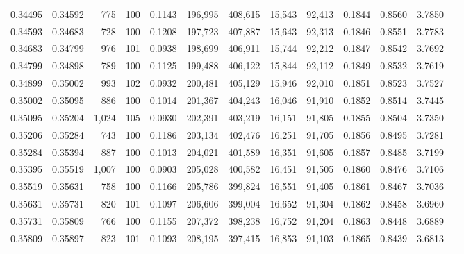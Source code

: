 \begin{tabular}{rrrrrrrrrrrrr}
0.34495 & 0.34592 &   775 & 100 &                                     0.1143 & 196,995 & 408,615 &  15,543 &  92,413 & 0.1844 & 0.8560 & 3.7850 \\
0.34593 & 0.34683 &   728 & 100 &                                     0.1208 & 197,723 & 407,887 &  15,643 &  92,313 & 0.1846 & 0.8551 & 3.7783 \\
0.34683 & 0.34799 &   976 & 101 &                                     0.0938 & 198,699 & 406,911 &  15,744 &  92,212 & 0.1847 & 0.8542 & 3.7692 \\
0.34799 & 0.34898 &   789 & 100 &                                     0.1125 & 199,488 & 406,122 &  15,844 &  92,112 & 0.1849 & 0.8532 & 3.7619 \\
0.34899 & 0.35002 &   993 & 102 &                                     0.0932 & 200,481 & 405,129 &  15,946 &  92,010 & 0.1851 & 0.8523 & 3.7527 \\
0.35002 & 0.35095 &   886 & 100 &                                     0.1014 & 201,367 & 404,243 &  16,046 &  91,910 & 0.1852 & 0.8514 & 3.7445 \\
0.35095 & 0.35204 & 1,024 & 105 &                                     0.0930 & 202,391 & 403,219 &  16,151 &  91,805 & 0.1855 & 0.8504 & 3.7350 \\
0.35206 & 0.35284 &   743 & 100 &                                     0.1186 & 203,134 & 402,476 &  16,251 &  91,705 & 0.1856 & 0.8495 & 3.7281 \\
0.35284 & 0.35394 &   887 & 100 &                                     0.1013 & 204,021 & 401,589 &  16,351 &  91,605 & 0.1857 & 0.8485 & 3.7199 \\
0.35395 & 0.35519 & 1,007 & 100 &                                     0.0903 & 205,028 & 400,582 &  16,451 &  91,505 & 0.1860 & 0.8476 & 3.7106 \\
0.35519 & 0.35631 &   758 & 100 &                                     0.1166 & 205,786 & 399,824 &  16,551 &  91,405 & 0.1861 & 0.8467 & 3.7036 \\
0.35631 & 0.35731 &   820 & 101 &                                     0.1097 & 206,606 & 399,004 &  16,652 &  91,304 & 0.1862 & 0.8458 & 3.6960 \\
0.35731 & 0.35809 &   766 & 100 &                                     0.1155 & 207,372 & 398,238 &  16,752 &  91,204 & 0.1863 & 0.8448 & 3.6889 \\
0.35809 & 0.35897 &   823 & 101 &                                     0.1093 & 208,195 & 397,415 &  16,853 &  91,103 & 0.1865 & 0.8439 & 3.6813 \\

\end{tabular}
